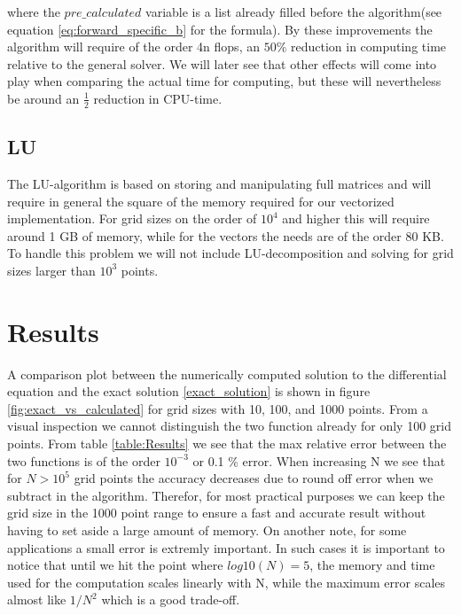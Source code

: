 \documentclass[a4paper,11pt]{article}
\begin{document}
{where the $pre\_ calculated$ variable is a list already filled before the algorithm(see equation \ref{eq:forward_specific_b} for the formula). By these improvements the algorithm will require of the order 4n flops, an $50\%$ reduction in computing time relative to the general solver. We will later see that other effects will come into play when comparing the actual time for computing, but these will nevertheless be around an $\frac{1}{2}$ reduction in CPU-time.  

\subsection{LU}
The LU-algorithm is based on storing and manipulating full matrices and will require in general the square of the memory required for our vectorized implementation. For grid sizes on the order of $10^4$ and higher this will require around 1 GB of memory, while for the vectors the needs are of the order 80 KB. To handle this problem we will not include LU-decomposition and solving for grid sizes larger than $10^3$ points. 

\section*{Results}

A comparison plot between the numerically computed solution to the differential equation and the exact solution \ref{exact_solution} is shown in figure \ref{fig:exact_vs_calculated} for grid sizes with 10, 100, and 1000 points. From a visual inspection we cannot distinguish the two function already for only 100 grid points. From table \ref*{table:Results} we see that the max relative error between the two functions is of the order $10^{-3}$ or 0.1 \% error. When increasing N we see that for $N>10^{5}$ grid points the accuracy decreases due to round off error when we subtract in the algorithm. Therefor, for most practical purposes we can keep the grid size in the 1000 point range to ensure a fast and accurate result without having to set aside a large amount of memory. On another note, for some applications a small error is extremly important. In such cases it is important to notice that until we hit the point where $log10(N)=5$, the memory and time used for the computation scales linearly with N, while the maximum error scales almost like $1/N^2$ which is a good trade-off. 



}
\end{document}
